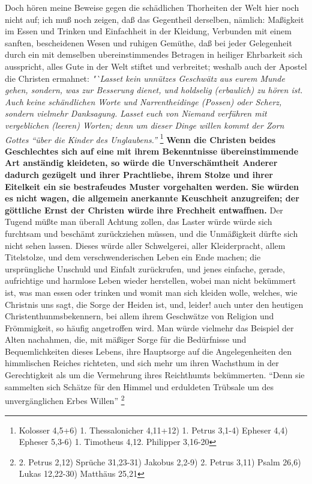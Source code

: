 Doch hören meine Beweise gegen die schädlichen Thorheiten der Welt hier noch
nicht auf; ich muß noch zeigen, daß das Gegentheil derselben, nämlich:
Maßigkeit
im Essen und Trinken und Einfachheit in der Kleidung, Verbunden mit einem
sanften, bescheidenen Wesen und ruhigen Gemüthe, daß bei jeder Gelegenheit durch
ein mit demselben ubereinstimmendes Betragen in heiliger Ehrbarkeit sich
ausspricht, alles Gute in der Welt stiftet und verbreitet; weshalb auch der
Apostel die Christen ermahnet:
\textit{"`Lasset kein unnützes Geschwätz aus eurem Munde
gehen, sondern, was zur Besserung dienet, und holdselig (erbaulich) zu hören
ist. Auch keine schändlichen Worte und Narrentheidinge (Possen) oder Scherz,
sondern vielmehr Danksagung. Lasset euch von Niemand verführen mit vergeblichen
(leeren) Worten; denn um dieser Dinge willen kommt der Zorn Gottes "`über die
Kinder des Unglaubens."'}
\footnote{
Kolosser 4,5+6)
1. Thessalonicher 4,11+12)
1. Petrus 3,1-4)
Epheser 4,4)
Epheser 5,3-6)
1. Timotheus 4,12.
Philipper 3,16-20}
\textbf{Wenn die Christen
beides Geschlechtes sich auf eine mit ihrem Bekenntnisse übereinstimmende Art
anständig kleideten, so würde die Unverschämtheit Anderer dadurch gezügelt und
ihrer Prachtliebe, ihrem Stolze und ihrer Eitelkeit ein sie bestrafeudes Muster
vorgehalten werden. Sie würden es nicht wagen, die allgemein anerkannte
Keuschheit anzugreifen; der göttliche Ernst der Christen würde ihre Frechheit
entwaffnen.} Der Tugend müßte man überall Achtung zollen, das Laster würde würde
sich furchtsam und beschämt zurückziehen müssen, und die Unmäßigkeit dürfte sich
nicht sehen lassen. Dieses würde aller Schwelgerei, aller Kleiderpracht, allem
Titelstolze, und dem verschwenderischen Leben ein Ende machen; die ursprüngliche
Unschuld und Einfalt zurückrufen, und jenes einfache, gerade, aufrichtige und
harmlose Leben wieder herstellen, wobei man nicht bekümmert ist, was man essen
oder trinken und womit man sich kleiden wolle, welches, wie Christnis uns sagt,
die Sorge der Heiden ist, und, leider! auch unter den heutigen
Christenthunmsbekennern, bei allem ihrem Geschwätze von Religion und
Frömmigkeit, so häufig angetroffen wird. Man würde vielmehr das Beispiel der
Alten nachahmen, die, mit mäßiger Sorge für die Bedürfnisse und Bequemlichkeiten
dieses Lebens, ihre Hauptsorge auf die Angelegenheiten den himmlischen
Reiches
richteten, und sich mehr um ihren Wachsthum in der Gerechtigkeit als um die
Vermehrung ihres Reichthumts bekümmerten. "`Denn sie sammelten sich Schätze für
den Himmel und erduldeten Trübsale um des unvergänglichen Erbes
Willen"'
\footnote{
2. Petrus 2,12)
Sprüche 31,23-31)
Jakobus 2,2-9)
2. Petrus 3,11)
Psalm 26,6)
Lukas  12,22-30)
Matthäus 25,21}

